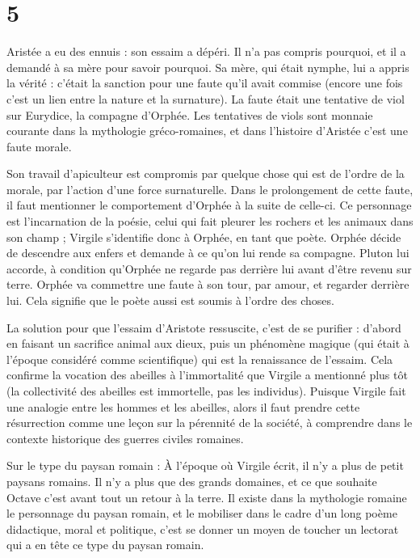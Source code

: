 \documentclass[a4paper,12pt]{book}
\begin{document}
\section{5}
Aristée a eu des ennuis : son essaim a dépéri. Il n'a pas compris pourquoi, et il a demandé à sa mère pour savoir pourquoi. Sa mère, qui était nymphe, lui a appris la vérité : c'était la sanction pour une faute qu'il avait commise (encore une fois c'est un lien entre la nature et la surnature). La faute était une tentative de viol sur Eurydice, la compagne d'Orphée. Les tentatives de viols sont monnaie courante dans la mythologie gréco-romaines, et dans l'histoire d'Aristée c'est une faute morale.
\par Son travail d'apiculteur est compromis par quelque chose qui est de l'ordre de la morale, par l'action d'une force surnaturelle. Dans le prolongement de cette faute, il faut mentionner le comportement d'Orphée à la suite de celle-ci. Ce personnage est l'incarnation de la poésie, celui qui fait pleurer les rochers et les animaux dans son champ ; Virgile s'identifie donc à Orphée, en tant que poète. Orphée décide de descendre aux enfers et demande à ce qu'on lui rende sa compagne. Pluton lui accorde, à condition qu'Orphée ne regarde pas derrière lui avant d'être revenu sur terre. Orphée va commettre une faute à son tour, par amour, et regarder derrière lui. Cela signifie que le poète aussi est soumis à l'ordre des choses.
\par La solution pour que l'essaim d'Aristote ressuscite, c'est de se purifier : d'abord en faisant un sacrifice animal aux dieux, puis un phénomène magique (qui était à l'époque considéré comme scientifique) qui est la renaissance de l'essaim. Cela confirme la vocation des abeilles à l'immortalité que Virgile a mentionné plus tôt (la collectivité des abeilles est immortelle, pas les individus). Puisque Virgile fait une analogie entre les hommes et les abeilles, alors il faut prendre cette résurrection comme une leçon sur la pérennité de la société, à comprendre dans le contexte historique des guerres civiles romaines.
\par Sur le type du paysan romain : À l'époque où Virgile écrit, il n'y a plus de petit paysans romains. Il n'y a plus que des grands domaines, et ce que souhaite Octave c'est avant tout un retour à la terre. Il existe dans la mythologie romaine le personnage du paysan romain, et le mobiliser dans le cadre d'un long poème didactique, moral et politique, c'est se donner un moyen de toucher un lectorat qui a en tête ce type du paysan romain.
\end{document}
